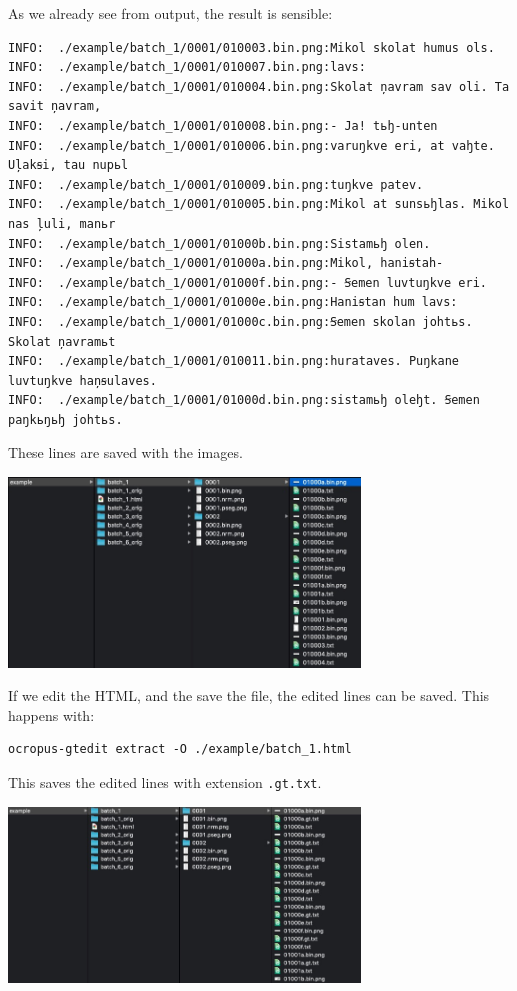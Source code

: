 \documentclass[]{book}
\begin{document}
As we already see from output, the result is sensible:

\begin{verbatim}
INFO:  ./example/batch_1/0001/010003.bin.png:Mikol skolat humus ols.
INFO:  ./example/batch_1/0001/010007.bin.png:lavs:
INFO:  ./example/batch_1/0001/010004.bin.png:Skolat ņavram sav oli. Ta savit ņavram,
INFO:  ./example/batch_1/0001/010008.bin.png:- Ja! tьꜧ-unten
INFO:  ./example/batch_1/0001/010006.bin.png:varuŋkve eri, at vaꜧte. Uļakꞩi, tau nupьl
INFO:  ./example/batch_1/0001/010009.bin.png:tuŋkve patev.
INFO:  ./example/batch_1/0001/010005.bin.png:Mikol at sunsьꜧlas. Mikol nas ļuli, manьr
INFO:  ./example/batch_1/0001/01000b.bin.png:Sistamьꜧ olen.
INFO:  ./example/batch_1/0001/01000a.bin.png:Mikol, haniꞩtah-
INFO:  ./example/batch_1/0001/01000f.bin.png:- Ꞩemen luvtuŋkve eri.
INFO:  ./example/batch_1/0001/01000e.bin.png:Haniꞩtan hum lavs:
INFO:  ./example/batch_1/0001/01000c.bin.png:Ꞩemen skolan johtьs. Skolat ņavramьt
INFO:  ./example/batch_1/0001/010011.bin.png:hurataves. Puŋkane luvtuŋkve haņꞩulaves.
INFO:  ./example/batch_1/0001/01000d.bin.png:sistamьꜧ oleꜧt. Ꞩemen paŋkьŋьꜧ johtьs.
\end{verbatim}

These lines are saved with the images.

\includegraphics[width=0.7\textwidth,height=\textheight]{./images/ocropy_export_from_html.jpg}

If we edit the HTML, and the save the file, the edited lines can be saved. This happens with:

\begin{verbatim}
ocropus-gtedit extract -O ./example/batch_1.html
\end{verbatim}

This saves the edited lines with extension \texttt{.gt.txt}.

\includegraphics[width=0.7\textwidth,height=\textheight]{./images/ocropy_export_gt.jpg}
\end{document}
